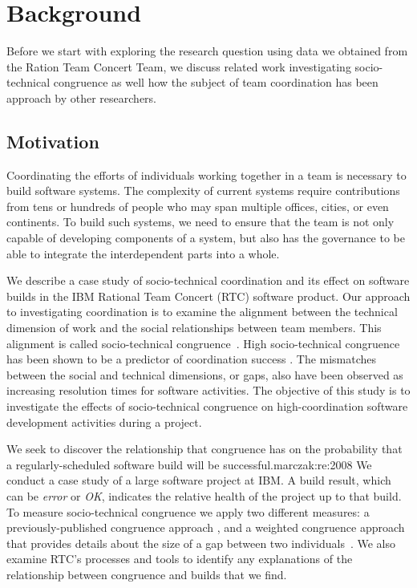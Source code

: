 \section{Background}
\label{sec:background}
Before we start with exploring the research question using data we obtained from the Ration Team Concert Team, we discuss related work investigating socio-technical congruence as well how the subject of team coordination has been approach by other researchers.

\subsection{Motivation}
Coordinating the efforts of individuals working together in a team is
necessary to build software systems. The complexity of current systems require contributions
from tens or hundreds of people who may span multiple offices, cities, or even continents.
To build such systems, we need to ensure that the team is not only capable of
developing components of a system, but also has the governance to be able to integrate the
interdependent parts into a whole.

We describe a case study of socio-technical coordination and its effect on software builds in the IBM
Rational Team Concert (RTC) software product.
Our approach to investigating coordination is to examine the
alignment between the technical dimension of work and the social relationships
between team members. This alignment is called socio-technical
congruence~\cite{cataldo:cscw:2006}. High socio-technical congruence
has been shown to be a predictor of coordination success
\cite{cataldo:cscw:2006,ehrlich:stc:2008}.
The mismatches between the social and technical dimensions, or gaps,
also have been observed as increasing resolution times for software activities.
The objective of this study is to investigate the effects of socio-technical congruence on high-coordination software development activities during a project.

We seek to discover the relationship that congruence has on the probability that a regularly-scheduled software build will be successful.marczak:re:2008
We conduct a case study of a large software project at IBM.  A build result, which can be \emph{error} or \emph{OK}, indicates the relative health of the project up to that build. To
measure socio-technical congruence we apply two different measures: a
previously-published congruence approach \cite{cataldo:cscw:2006},
and a weighted congruence approach that provides details about the size of a
gap between two individuals~\cite{kwan2009:weighted}. We
also examine RTC's processes and tools to identify any
explanations of the relationship between congruence and builds that
we find.


